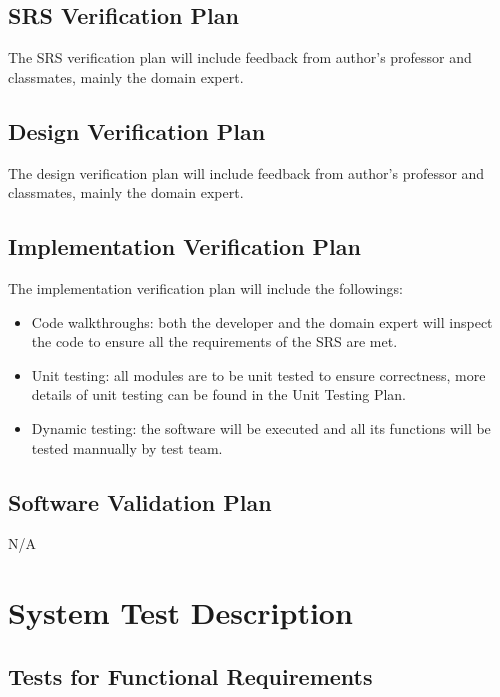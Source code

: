 \documentclass[12pt, titlepage]{article}
\begin{document}
\subsection{SRS Verification Plan}

The SRS verification plan will include feedback from author's professor and classmates, mainly the domain expert. 


\subsection{Design Verification Plan}

The design verification plan will include feedback from author's professor and classmates, mainly the domain expert. 


\subsection{Implementation Verification Plan}

The implementation verification plan will include the followings:
\begin{itemize}
    \item Code walkthroughs: both the developer and the domain expert will inspect the code to ensure all the requirements of the SRS are met.
    \item Unit testing: all modules are to be unit tested to ensure correctness, more details of unit testing can be found in the Unit Testing Plan.
    \item Dynamic testing: the software will be executed and all its functions will be tested mannually by test team.
\end{itemize}


\subsection{Software Validation Plan}

N/A


\section{System Test Description}\label{sec_sysTest}
	
\subsection{Tests for Functional Requirements}
\end{document}
